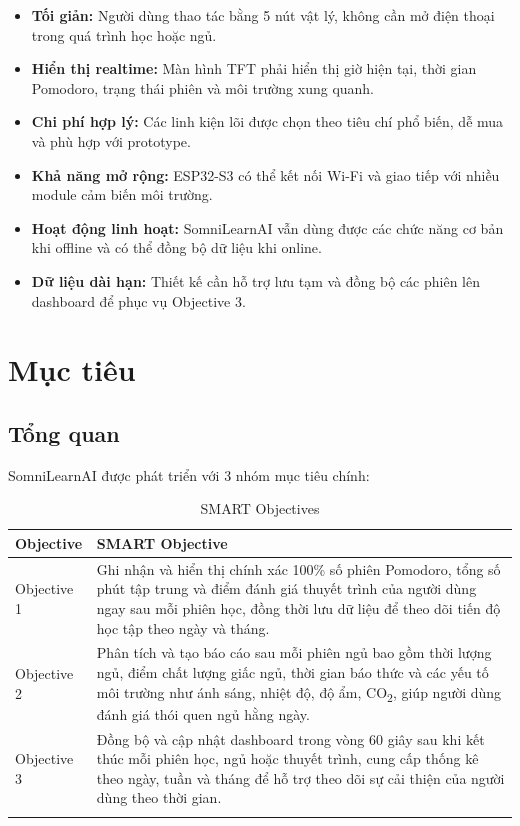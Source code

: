 \documentclass[12pt,a4paper]{article}
\begin{document}
\begin{itemize}
    \item \textbf{Tối giản:} Người dùng thao tác bằng 5 nút vật lý, không cần mở điện thoại trong quá trình học hoặc ngủ.
    \item \textbf{Hiển thị realtime:} Màn hình TFT phải hiển thị giờ hiện tại, thời gian Pomodoro, trạng thái phiên và môi trường xung quanh.
    \item \textbf{Chi phí hợp lý:} Các linh kiện lõi được chọn theo tiêu chí phổ biến, dễ mua và phù hợp với prototype.
    \item \textbf{Khả năng mở rộng:} ESP32-S3 có thể kết nối Wi-Fi và giao tiếp với nhiều module cảm biến môi trường.
    \item \textbf{Hoạt động linh hoạt:} SomniLearnAI vẫn dùng được các chức năng cơ bản khi offline và có thể đồng bộ dữ liệu khi online.
    \item \textbf{Dữ liệu dài hạn:} Thiết kế cần hỗ trợ lưu tạm và đồng bộ các phiên lên dashboard để phục vụ Objective 3.
\end{itemize}

\newpage
\section{Mục tiêu}

\subsection{Tổng quan}

SomniLearnAI được phát triển với 3 nhóm mục tiêu chính:

\begin{longtable}{|P{2.8cm}|P{11.8cm}|}
\hline
\textbf{Objective} & \textbf{SMART Objective} \\
\hline
Objective 1 & Ghi nhận và hiển thị chính xác 100\% số phiên Pomodoro, tổng số phút tập trung và điểm đánh giá thuyết trình của người dùng ngay sau mỗi phiên học, đồng thời lưu dữ liệu để theo dõi tiến độ học tập theo ngày và tháng. \\
\hline
Objective 2 & Phân tích và tạo báo cáo sau mỗi phiên ngủ bao gồm thời lượng ngủ, điểm chất lượng giấc ngủ, thời gian báo thức và các yếu tố môi trường như ánh sáng, nhiệt độ, độ ẩm, CO\textsubscript{2}, giúp người dùng đánh giá thói quen ngủ hằng ngày. \\
\hline
Objective 3 & Đồng bộ và cập nhật dashboard trong vòng 60 giây sau khi kết thúc mỗi phiên học, ngủ hoặc thuyết trình, cung cấp thống kê theo ngày, tuần và tháng để hỗ trợ theo dõi sự cải thiện của người dùng theo thời gian. \\
\hline
\caption{SMART Objectives}
\end{longtable}
\end{document}
